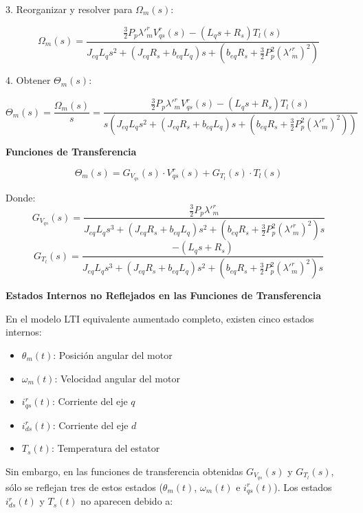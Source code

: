 \documentclass{article}
\begin{document}
3. Reorganizar y resolver para \( \Omega_m(s) \):

\[
\Omega_m(s) = \frac{\frac{3}{2} P_p \lambda'^r_m V^r_{qs}(s) - (L_q s + R_s) T_l(s)}{J_{eq} L_q s^2 + (J_{eq} R_s + b_{eq} L_q) s + \left(b_{eq} R_s + \frac{3}{2} P_p^2 (\lambda'^r_m)^2\right)}
\]

4. Obtener \( \Theta_m(s) \):

\[
\Theta_m(s) = \frac{\Omega_m(s)}{s} = \frac{\frac{3}{2} P_p \lambda'^r_m V^r_{qs}(s) - (L_q s + R_s) T_l(s)}{s \left( J_{eq} L_q s^2 + (J_{eq} R_s + b_{eq} L_q) s + \left(b_{eq} R_s + \frac{3}{2} P_p^2 (\lambda'^r_m)^2 \right) \right)}
\]

\textbf{Funciones de Transferencia}

\[
\Theta_m(s) = G_{V_{qs}}(s) \cdot V^r_{qs}(s) + G_{T_l}(s) \cdot T_l(s)
\]

Donde:
\begin{equation}
G_{V_{qs}}(s) = \frac{\frac{3}{2} P_p \lambda'^r_m}{J_{eq} L_q s^3 + (J_{eq} R_s + b_{eq} L_q) s^2 + \left(b_{eq} R_s + \frac{3}{2} P_p^2 (\lambda'^r_m)^2\right) s}
\end{equation}
\begin{equation}
G_{T_l}(s) = \frac{-(L_q s + R_s)}{J_{eq} L_q s^3 + (J_{eq} R_s + b_{eq} L_q) s^2 + \left(b_{eq} R_s + \frac{3}{2} P_p^2 (\lambda'^r_m)^2\right) s}
\end{equation}

\textbf{Estados Internos no Reflejados en las Funciones de Transferencia}

En el modelo LTI equivalente aumentado completo, existen cinco estados internos:

\begin{itemize}
    \item \( \theta_m(t) \): Posición angular del motor
    \item \( \omega_m(t) \): Velocidad angular del motor
    \item \( i_{qs}^r(t) \): Corriente del eje \( q \)
    \item \( i_{ds}^r(t) \): Corriente del eje \( d \)
    \item \( T_s(t) \): Temperatura del estator
\end{itemize}

Sin embargo, en las funciones de transferencia obtenidas \( G_{V_{qs}}(s) \) y \( G_{T_l}(s) \), sólo se reflejan tres de estos estados (\( \theta_m(t) \), \( \omega_m(t) \) e \( i_{qs}^r(t) \)). Los estados \( i_{ds}^r(t) \) y \( T_s(t) \) no aparecen debido a:
\end{document}
